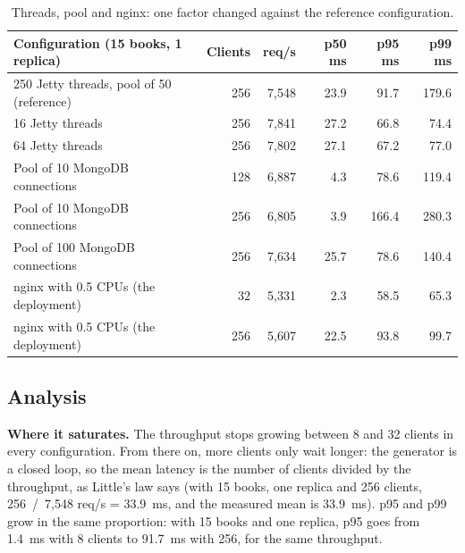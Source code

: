 \begin{table}[H]
\centering\small
\begin{tabular}{@{}lrrrrr@{}}
\toprule
\textbf{Configuration (15 books, 1 replica)} & \textbf{Clients} & \textbf{req/s} & \textbf{p50 ms} & \textbf{p95 ms} &
\textbf{p99 ms} \\
\midrule
250 Jetty threads, pool of 50 (reference) & 256 & 7,548 & 23.9 & 91.7 & 179.6 \\
16 Jetty threads & 256 & 7,841 & 27.2 & 66.8 & 74.4 \\
64 Jetty threads & 256 & 7,802 & 27.1 & 67.2 & 77.0 \\
\midrule
Pool of 10 MongoDB connections & 128 & 6,887 & 4.3 & 78.6 & 119.4 \\
Pool of 10 MongoDB connections & 256 & 6,805 & 3.9 & 166.4 & 280.3 \\
Pool of 100 MongoDB connections & 256 & 7,634 & 25.7 & 78.6 & 140.4 \\
\midrule
nginx with 0.5 CPUs (the deployment) & 32 & 5,331 & 2.3 & 58.5 & 65.3 \\
nginx with 0.5 CPUs (the deployment) & 256 & 5,607 & 22.5 & 93.8 & 99.7 \\
\bottomrule
\end{tabular}
\caption{Threads, pool and nginx: one factor changed against the reference configuration.}
\label{tab:load-factors}
\end{table}

\subsection{Analysis}

\textbf{Where it saturates.} The throughput stops growing between 8 and 32 clients in every configuration. From
there on, more clients only wait longer: the generator is a closed loop, so the mean latency is the number of clients
divided by the throughput, as Little's law says (with 15 books, one replica and 256 clients, 256~/~7,548 req/s =
33.9~ms, and the measured mean is 33.9~ms). p95 and p99 grow in the same proportion: with 15 books and one replica, p95
goes from 1.4~ms with 8 clients to 91.7~ms with 256, for the same throughput.

